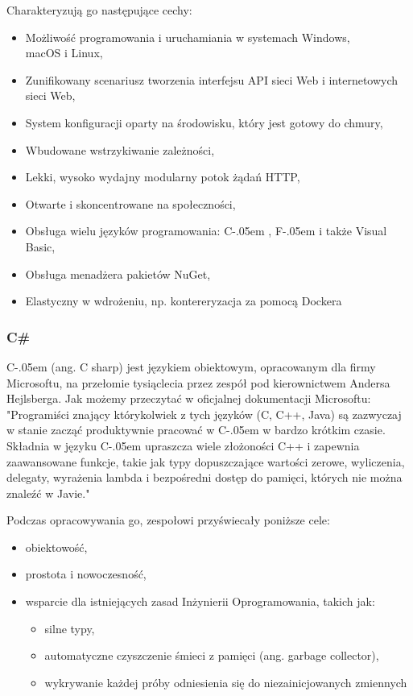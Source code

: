 \documentclass[12pt]{article}
\newcommand{\Csharp}{%
  {\settoheight{\dimen0}{C}C\kern-.05em \resizebox{!}{\dimen0}{\raisebox{\depth}{\# }}}}
\newcommand{\Fsharp}{%
  {\settoheight{\dimen0}{F}F\kern-.05em \resizebox{!}{\dimen0}{\raisebox{\depth}{\# }}}}
\numberwithin{figure}{section}
\begin{document}
\begin{sloppypar}
Charakteryzują go następujące cechy:
\begin{itemize}
    \item Możliwość programowania i uruchamiania w systemach Windows,\\ macOS i Linux,
    \item Zunifikowany scenariusz tworzenia interfejsu API sieci Web i internetowych sieci Web,
    \item System konfiguracji oparty na środowisku, który jest gotowy do chmury,
    \item Wbudowane wstrzykiwanie zależności,
    \item Lekki, wysoko wydajny modularny potok żądań HTTP,
    \item Otwarte i skoncentrowane na społeczności,
    \item Obsługa wielu języków programowania: \Csharp, \Fsharp i także Visual Basic,
    \item Obsługa menadżera pakietów NuGet,
    \item Elastyczny w wdrożeniu, np. kontereryzacja za pomocą Dockera
\end{itemize}
\subsubsection{C\#}
\Csharp (ang. C sharp) jest językiem obiektowym, opracowanym dla firmy Microsoftu, na przełomie tysiąclecia przez zespół pod kierownictwem Andersa Hejlsberga. Jak możemy przeczytać w oficjalnej dokumentacji Microsoftu: 
"Programiści znający którykolwiek z tych języków (C, C++, Java) są zazwyczaj w stanie zacząć produktywnie pracować w \Csharp w bardzo krótkim czasie. Składnia w języku \Csharp upraszcza wiele złożoności C++ i zapewnia zaawansowane funkcje, takie jak typy dopuszczające wartości zerowe, wyliczenia, delegaty, wyrażenia lambda i bezpośredni dostęp do pamięci, których nie można znaleźć w Javie." \cite{csharp} 
    
Podczas opracowywania go, zespołowi przyświecały poniższe cele:
\begin{itemize}
    \item obiektowość,
    \item prostota i nowoczesność,
    \item wsparcie dla istniejących zasad Inżynierii Oprogramowania, takich jak:
    \begin{itemize}
       \item silne typy,
       \item automatyczne czyszczenie śmieci z pamięci (ang. garbage collector),
       \item wykrywanie każdej próby odniesienia się do niezainicjowanych zmiennych
    \end{itemize}
\end{itemize}
    

\end{sloppypar}
\end{document}
